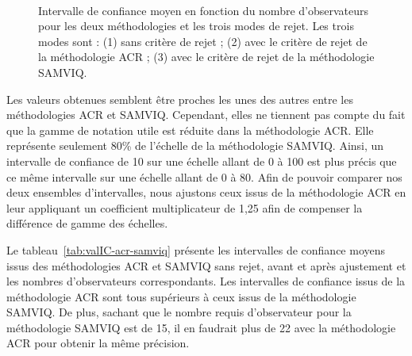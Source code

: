 \begin{figure}[htbp]
\centering
{}\hfill
{}\\
\caption{Intervalle de confiance moyen en fonction du nombre d'observateurs pour les deux méthodologies et les trois modes de rejet. Les trois modes sont : (1) sans critère de rejet ; (2) avec le critère de rejet de la méthodologie ACR ; (3) avec le critère de rejet de la méthodologie SAMVIQ.}
\end{figure}

Les valeurs obtenues semblent être proches les unes des autres entre les méthodologies ACR et SAMVIQ. Cependant, elles ne tiennent pas compte du fait que la gamme de notation utile est réduite dans la méthodologie ACR. Elle représente seulement 80\% de l'échelle de la méthodologie SAMVIQ. Ainsi, un intervalle de confiance de 10 sur une échelle allant de 0 à 100 est plus précis que ce même intervalle sur une échelle allant de 0 à 80. Afin de pouvoir comparer nos deux ensembles d'intervalles, nous ajustons ceux issus de la méthodologie ACR en leur appliquant un coefficient multiplicateur de 1,25 afin de compenser la différence de gamme des échelles.

Le tableau~\ref{tab:valIC-acr-samviq} présente les intervalles de confiance moyens issus des méthodologies ACR et SAMVIQ sans rejet, avant et après ajustement et les nombres d'observateurs correspondants. Les intervalles de confiance issus de la méthodologie ACR sont tous supérieurs à ceux issus de la méthodologie SAMVIQ. De plus, sachant que le nombre requis d'observateur pour la méthodologie SAMVIQ est de 15, il en faudrait plus de 22 avec la méthodologie ACR pour obtenir la même précision.

